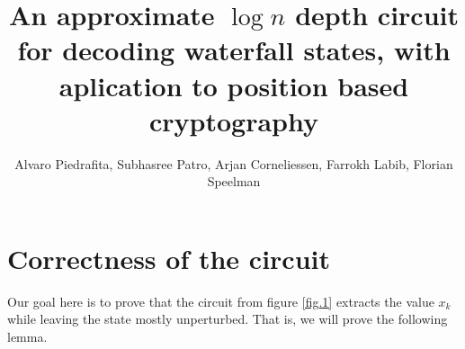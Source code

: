 \documentclass{article}
\theoremstyle{definition}
\begin{document}
\title{\large {\bf An approximate $\log n$ depth circuit for decoding waterfall states, with aplication to position based cryptography}}
\author{Alvaro Piedrafita, Subhasree Patro, Arjan Corneliessen, Farrokh Labib, Florian Speelman}
\maketitle





\section{Correctness of the circuit}

 Our goal here is to prove that the circuit from figure \ref{fig.1} extracts the value $x_k$ while leaving the state mostly unperturbed. That is, we will prove the following lemma.
\end{document}
